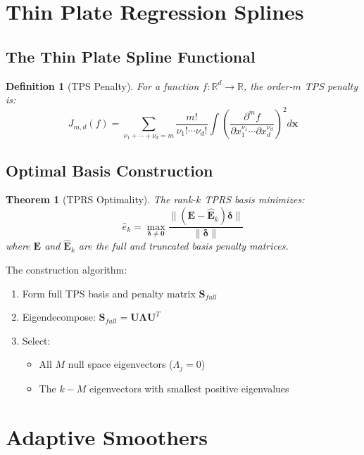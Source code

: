 \documentclass[12pt]{article}
\newtheorem{theorem}{Theorem}
\newtheorem{definition}{Definition}
\newcommand{\R}{\mathbb{R}}
\begin{document}
\section{Thin Plate Regression Splines}

\subsection{The Thin Plate Spline Functional}

\begin{definition}[TPS Penalty]
For a function $f: \R^d \to \R$, the order-$m$ TPS penalty is:
\begin{equation}
J_{m,d}(f) = \sum_{\nu_1+\cdots+\nu_d = m} \frac{m!}{\nu_1! \cdots \nu_d!} \int \left( \frac{\partial^m f}{\partial x_1^{\nu_1} \cdots \partial x_d^{\nu_d}} \right)^2 d\mathbf{x}
\end{equation}
\end{definition}

\subsection{Optimal Basis Construction}

\begin{theorem}[TPRS Optimality]
The rank-$k$ TPRS basis minimizes:
\begin{equation}
\hat{e}_k = \max_{\bm{\delta} \neq \mathbf{0}} \frac{\|(\mathbf{E} - \hat{\mathbf{E}}_k)\bm{\delta}\|}{\|\bm{\delta}\|}
\end{equation}
where $\mathbf{E}$ and $\hat{\mathbf{E}}_k$ are the full and truncated basis penalty matrices.
\end{theorem}

The construction algorithm:
\begin{enumerate}
    \item Form full TPS basis and penalty matrix $\mathbf{S}_{full}$
    \item Eigendecompose: $\mathbf{S}_{full} = \mathbf{U}\bm{\Lambda}\mathbf{U}^T$
    \item Select:
    \begin{itemize}
        \item All $M$ null space eigenvectors ($\Lambda_j = 0$)
        \item The $k-M$ eigenvectors with smallest positive eigenvalues
    \end{itemize}
\end{enumerate}

\section{Adaptive Smoothers}
\end{document}
